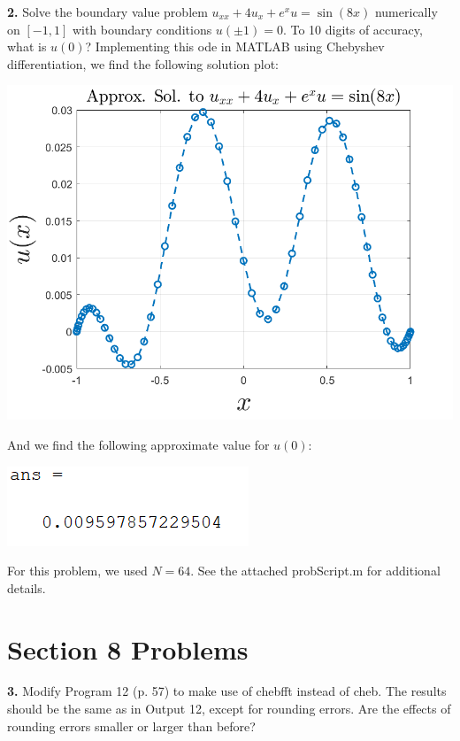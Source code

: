 \documentclass{article}
\begin{document}
\textbf{2.} Solve the boundary value problem $u_{xx} + 4u_x + e^xu = \sin(8x)$ numerically on $[-1,1]$ with boundary conditions $u(\pm 1) = 0$. To 10 digits of accuracy, what is $u(0)$?
\newline\newline
Implementing this ode in MATLAB using Chebyshev differentiation, we find the following solution plot:
\begin{center}
    \includegraphics[scale = 0.6]{7_2_sol_plot}
\end{center}
And we find the following approximate value for $u(0)$:
\begin{center}
    \includegraphics[scale = 1]{u(0)}
\end{center}
For this problem, we used $N = 64$. See the attached probScript.m for additional details.

\section*{Section 8 Problems}
\textbf{3.} Modify Program 12 (p. 57) to make use of chebfft instead of cheb. The results should be the same as in Output 12, except for rounding errors. Are the effects of rounding errors smaller or larger than before?
\newline\newline
\end{document}
